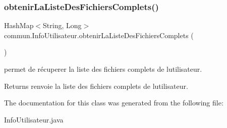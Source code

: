 \subsubsection{\texorpdfstring{obtenir\+La\+Liste\+Des\+Fichiers\+Complets()}{obtenirLaListeDesFichiersComplets()}}
{\footnotesize\ttfamily Hash\+Map$<$String, Long$>$ commun.\+Info\+Utilisateur.\+obtenir\+La\+Liste\+Des\+Fichiers\+Complets (\begin{DoxyParamCaption}{ }\end{DoxyParamCaption})\hspace{0.3cm}{\ttfamily [inline]}}



permet de récuperer la liste des fichiers complets de l\textquotesingle{}utilisateur. 

\begin{DoxyReturn}{Returns}
renvoie la liste des fichiers complets de l\textquotesingle{}utilisateur. 
\end{DoxyReturn}


The documentation for this class was generated from the following file\+:\begin{DoxyCompactItemize}
\item 
Info\+Utilisateur.\+java\end{DoxyCompactItemize}
